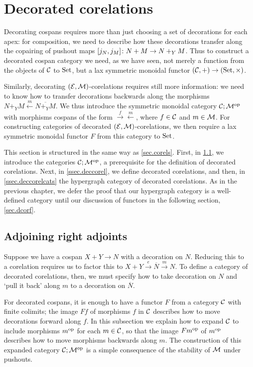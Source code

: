 \section{Decorated corelations} \label{sec:dcorc}

Decorating cospans requires more than just choosing a set of decorations for
each apex: for composition, we need to describe how these decorations transfer
along the copairing of pushout maps $[j_N,j_M]{\colon} N+M \to N+_YM$. Thus to
construct a decorated cospan category we need, as we have seen, not merely a
function from the objects of $\mathcal C$ to $\mathrm{Set}$, but a lax symmetric monoidal
functor $(\mathcal C,+) \to (\mathrm{Set},\times)$. 

Similarly, decorating $(\mathcal E,\mathcal M)$-corelations requires still more
information: we need to know how to transfer decorations backwards along the
morphisms $N+_YM \xleftarrow{m} \overline{N+_YM}$. We thus introduce the
symmetric monoidal category $\mathcal C;\mathcal M^{\mathrm{op}}$ with morphisms cospans of the
form $\xrightarrow{f}\xleftarrow{m}$, where $f \in \mathcal C$ and $m \in \mathcal M$.
For constructing categories of decorated $(\mathcal E,\mathcal M)$-corelations,
we then require a lax symmetric monoidal functor $F$ from this category to
$\mathrm{Set}$. 

This section is structured in the same way as \textsection\ref{sec.corels}.
First, in \textsection\ref{ssec.rightads}, we introduce the categories $\mathcal
C;\mathcal M^{\mathrm{op}}$, a prerequisite for the definition of decorated corelations. Next,
in \textsection\ref{ssec.deccorel}, we define decorated corelations, and then,
in \textsection\ref{ssec.deccorelcats} the hypergraph category of decorated
corelations. As in the previous chapter, we defer the proof that our hypergraph
category is a well-defined category until our discussion of functors in the
following section, \textsection\ref{sec.dcorf}.

\subsection{Adjoining right adjoints} \label{ssec.rightads}

Suppose we have a cospan $X+Y \to N$ with a decoration on $N$. Reducing this to
a corelation requires us to factor this to $X+Y \stackrel{e}\to \overline{N}
\stackrel{m}\to N$. To define a category of decorated corelations, then, we must
specify how to take decoration on $N$ and `pull it back' along $m$ to a decoration on
$\overline{N}$.

For decorated cospans, it is enough to have a functor $F$ from a category $\mathcal
C$ with finite colimits; the image $Ff$ of morphisms $f$ in $\mathcal C$ describes
how to move decorations forward along $f$. In this subsection we explain how to
expand $\mathcal C$ to include morphisms $m^{\mathrm{op}}$ for each $m \in \mathcal C$, so that the
image $Fm^{\mathrm{op}}$ of $m^{\mathrm{op}}$ describes how to move morphisms backwards along $m$.
The construction of this expanded category $\mathcal C;\mathcal M^{\mathrm{op}}$ is a simple
consequence of the stability of $\mathcal M$ under pushouts.

